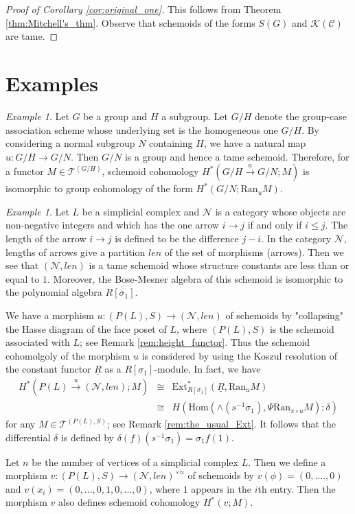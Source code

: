 \documentclass{amsart}
\theoremstyle{definition}
\theoremstyle{remark}
\newtheorem{ex}[thm]{Example}
\newcommand{\K}{R}%
\newcommand{\C}{{\mathcal C}}
\newcommand{\T}{{\mathcal T}}
\newcounter{eqn}[section]
\begin{document}
\begin{proof}[Proof of Corollary \ref{cor:original_one}]
This follows from Theorem \ref{thm:Mitchell's_thm}. Observe that schemoids of 
the forms $S(G)$ and ${\mathcal K}(\C)$ are tame.  
\end{proof}


\section{Examples}\label{Example}

\begin{ex} Let $G$ be a group and $H$ a subgroup.  
Let $G/H$ denote the group-case association scheme whose underlying set is the homogeneous one $G/H$.   
By considering a normal subgroup $N$ containing $H$, 
we have a natural map $u : G/H \to G/N$. Then $G/N$ is a group and hence a tame schemoid. Therefore, 
for a functor $M \in \T^{(G/H)}$,   
schemoid cohomology $H^*(G/H \stackrel{u}{\to} G/N; M)$ is isomorphic to group cohomology of the form  
$H^*(G/N ; \text{Ran}_uM)$. 
\end{ex}

\begin{ex}\label{ex:N}
Let $L$ be a simplicial complex and ${\mathcal N}$ is 
a category whose objects are non-negative integers and which has the one arrow $i \to j$ if and only if $i\leq j$.  
The length of the arrow $i \to j$ is defined to be the difference $j -i$.  
In the category ${\mathcal N}$, lengths of arrows give a partition $len$ of the set of morphisms (arrows). 
Then we see that $({\mathcal N}, len)$ is a tame schemoid whose structure constants are less than or equal to $1$. 
Moreover, the Bose-Mesner algebra of this schemoid is isomorphic to the polynomial algebra 
$\K[\sigma_1]$. 

We have a morphism  $u: (P(L), S) \to ({\mathcal N}, len)$ of schemoids by "collapsing" the Hasse diagram 
of the face poset of $L$, where $(P(L), S)$ is the schemoid associated with $L$; see Remark \ref{rem:height_functor}. 
Thus the schemoid cohomolgoly of the morphism $u$ is considered by using the Koszul resolution of the constant functor 
$\underline{\K}$ as a $\K[\sigma_1]$-module. 
In fact, we have 
\begin{eqnarray*}
H^*(P(L) \stackrel{u}{\to} ({\mathcal N}, len); M) &\cong& \text{Ext}^*_{\K[\sigma_1]}(\underline{\K}, \text{Ran}_u M)\\
&\cong& H(\text{Hom}(\wedge(s^{-1}\sigma_1), \Psi\text{Ran}_{\pi\circ u} M); \delta)
\end{eqnarray*}
for any $M \in \T^{(P(L), S)}$; see Remark \ref{rem:the_usual_Ext}. 
It follows that the differential $\delta$ is defined by $\delta(f)(s^{-1}\sigma_1) = \sigma_1f(1)$. 

Let $n$ be the number of vertices of a simplicial complex $L$. Then we define a morphism 
$v: (P(L), S) \to ({\mathcal N}, len)^{\times n}$ of schemoids by $v(\phi) = (0, ...., 0)$ and 
$v(x_i ) =(0, ..., 0, 1, 0, ..., 0)$, where $1$ appears in the $i$th entry. Then the morphism $v$ also defines schemoid cohomology 
$H^*(v ; M)$. 
\end{ex}
\end{document}

